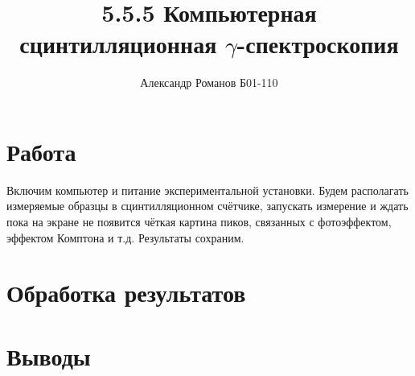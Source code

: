 \documentclass{article}
\author{Александр Романов Б01-110}
\date{}
\title{5.5.5 Компьютерная сцинтилляционная $\gamma$-спектроскопия}
\begin{document}
\maketitle
\section{Работа}
Включим компьютер и питание экспериментальной установки. Будем располагать измеряемые образцы в 
сцинтилляционном счётчике, запускать измерение и ждать пока на экране не появится чёткая картина пиков,
связанных с фотоэффектом, эффектом Комптона и т.д. Результаты сохраним.
\section{Обработка результатов}

\section{Выводы}
\end{document}
